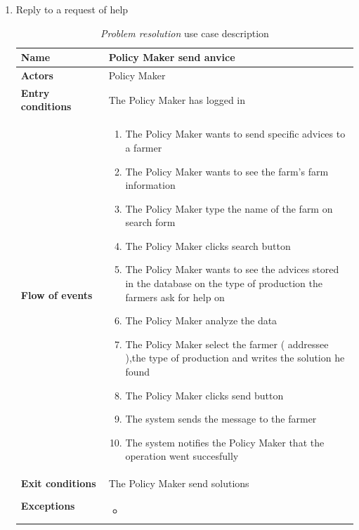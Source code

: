 \begin{enumerate}
    \item Reply to a request of help
    \begin{longtable}{p{0.26\linewidth}p{0.75\linewidth}}
        \toprule
        \textbf{Name} & \textbf{Policy Maker send anvice} \\
        \midrule
        \textbf{Actors} & Policy Maker \\
        \midrule
        \textbf{Entry conditions} & The Policy Maker has logged in\\
        \midrule
        \textbf{Flow of events} & 
        \begin{enumerate}
            \item The Policy Maker wants to send specific advices to a farmer
            \item The Policy Maker wants to see the farm's farm information
            \item The Policy Maker type the name of the farm on search form
            \item The Policy Maker clicks search button 
            \item The Policy Maker wants to see the advices stored in the database on the type of production the farmers ask for help on
            \item The Policy Maker analyze the data 
            \item The Policy Maker select the farmer ( addressee ),the type of production and writes the solution he found
            \item The Policy Maker clicks send button
            \item The system sends the message to the farmer
            \item The system notifies the Policy Maker that the operation went succesfully
        \end{enumerate} \\
        \midrule
        \textbf{Exit conditions} & The Policy Maker send solutions\\
        \midrule
        \textbf{Exceptions} & 
        \begin{itemize}
            \item 
        \end{itemize}\\
        \bottomrule
        \caption{\emph{Problem resolution} use case description}
    \end{longtable}
    \begin{figure}[H]
        \begin{center}

\end{center}
\end{figure}
\end{enumerate}

